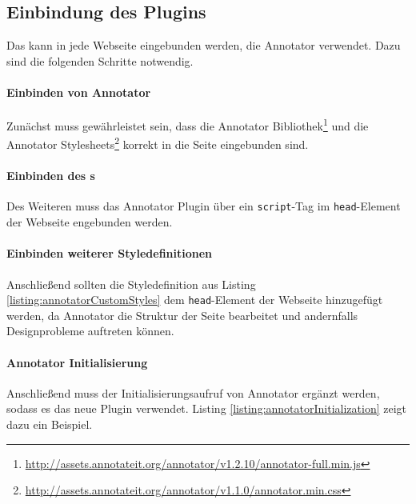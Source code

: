 \subsection{Einbindung des Plugins}
    Das {\annotatorPlugin} kann in jede Webseite eingebunden werden,
    die Annotator verwendet.
    Dazu sind die folgenden Schritte notwendig.

    \paragraph{Einbinden von Annotator}
    Zunächst muss gewährleistet sein, dass die
    Annotator Bibliothek\footnote{\url{http://assets.annotateit.org/annotator/v1.2.10/annotator-full.min.js}}
    und die Annotator Stylesheets\footnote{\url{http://assets.annotateit.org/annotator/v1.1.0/annotator.min.css}}
    korrekt in die Seite eingebunden sind.

    \paragraph{Einbinden des {\annotatorPlugin}s}
    Des Weiteren muss das Annotator Plugin über ein \texttt{script}-Tag
    im \texttt{head}-Element der Webseite engebunden werden.

    \paragraph{Einbinden weiterer Styledefinitionen}
    Anschließend sollten die Styledefinition aus Listing \ref{listing:annotatorCustomStyles}
    dem \texttt{head}-Element der Webseite hinzugefügt werden,
    da Annotator die Struktur der Seite bearbeitet und andernfalls Designprobleme auftreten können.

    

    \paragraph{Annotator Initialisierung}
    Anschließend muss der Initialisierungsaufruf von Annotator ergänzt werden,
    sodass es das neue Plugin verwendet.
    Listing \ref{listing:annotatorInitialization} zeigt dazu ein Beispiel.

    

